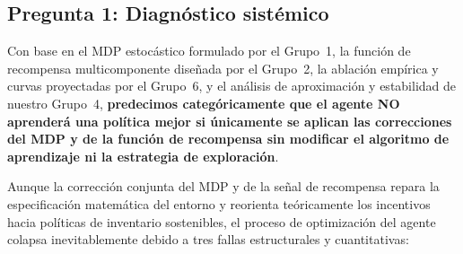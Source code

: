 \documentclass[11pt,letterpaper]{article}
\begin{document}
\subsection{Pregunta 1: Diagnóstico sistémico}

Con base en el MDP estocástico formulado por el Grupo~1, la función de recompensa multicomponente diseñada por el Grupo~2, la ablación empírica y curvas proyectadas por el Grupo~6, y el análisis de aproximación y estabilidad de nuestro Grupo~4, \textbf{predecimos categóricamente que el agente NO aprenderá una política mejor si únicamente se aplican las correcciones del MDP y de la función de recompensa sin modificar el algoritmo de aprendizaje ni la estrategia de exploración}.

Aunque la corrección conjunta del MDP y de la señal de recompensa repara la especificación matemática del entorno y reorienta teóricamente los incentivos hacia políticas de inventario sostenibles, el proceso de optimización del agente colapsa inevitablemente debido a tres fallas estructurales y cuantitativas:
\end{document}
